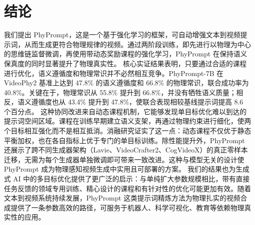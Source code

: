 \section{结论}
我们提出 PhyPrompt，这是一个基于强化学习的框架，可自动增强文本到视频提示词，从而生成更符合物理规律的视频。通过两阶段训练，即先进行以物理为中心的思维链监督微调，再使用带动态奖励课程的强化学习，PhyPrompt 在保持语义保真度的同时显著提升了物理真实性。
核心实证结果表明，只要通过合适的课程进行优化，语义遵循度和物理常识并不必然相互竞争。PhyPrompt-7B 在 VideoPhy2 基准上达到 47.8\% 的语义遵循度和 66.8\% 的物理常识，联合成功率为 40.8\%。关键在于，物理常识从 55.8\% 提升到 66.8\%，并没有牺牲语义质量；相反，语义遵循度也从 43.4\% 提升到 47.8\%，使联合表现相较基线提示词提高 8.6 个百分点。
这种协同改进来自动态课程机制，它能够发现单目标优化难以到达的提示词空间区域。课程在训练早期建立语义支架，再通过物理约束进行细化，使两个目标相互强化而不是相互抵消。消融研究证实了这一点：动态课程不仅优于静态平衡加权，也在各自指标上优于专门的单目标训练。除性能提升外，PhyPrompt 还展示了跨不同生成器架构（Lavie、VideoCrafter2、CogVideoX）的真正零样本迁移，无需为每个生成器单独微调即可带来一致改进。这种与模型无关的设计使 PhyPrompt 成为物理感知视频生成中实用且可部署的方案。
我们的结果也为生成式 AI 中的多目标优化提供了更广泛的启示：与单纯扩大参数规模相比，带有直接任务反馈的领域专用训练、精心设计的课程和有针对性的优化可能更加有效。随着文本到视频系统持续发展，PhyPrompt 这类提示词精炼方法为物理扎实的视频合成提供了一条参数高效的路径，可服务于机器人、科学可视化、教育等依赖物理真实性的应用。

